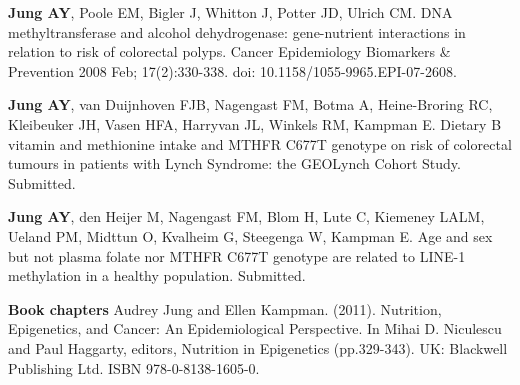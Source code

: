 \noindent \textbf{Jung AY}, Poole EM, Bigler J, Whitton J, Potter JD, Ulrich CM. DNA methyltransferase and alcohol dehydrogenase: gene-nutrient interactions in relation to risk of colorectal polyps. Cancer Epidemiology Biomarkers \& Prevention 2008 Feb; 17(2):330-338. doi: 10.1158/1055-9965.EPI-07-2608.

\noindent \textbf{Jung AY}, van Duijnhoven FJB, Nagengast FM, Botma A, Heine-Broring RC, Kleibeuker JH, Vasen HFA, Harryvan JL, Winkels RM, Kampman E. Dietary B vitamin and methionine intake and MTHFR C677T genotype on risk of colorectal tumours in patients with Lynch Syndrome: the GEOLynch Cohort Study. Submitted.

\noindent \textbf{Jung AY}, den Heijer M, Nagengast FM, Blom H, Lute C, Kiemeney LALM, Ueland PM, Midttun O, Kvalheim G, Steegenga W, Kampman E. Age and sex but not plasma folate nor MTHFR C677T genotype are related to LINE-1 methylation in a healthy population. Submitted.

\noindent \textbf{Book chapters}
\noindent Audrey Jung and Ellen Kampman. (2011). Nutrition, Epigenetics, and Cancer: An Epidemiological Perspective. In Mihai D. Niculescu and Paul Haggarty, editors, Nutrition in Epigenetics (pp.329-343). UK: Blackwell Publishing Ltd. ISBN 978-0-8138-1605-0.
